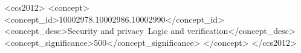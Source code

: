 \documentclass[sigconf,anonymous,review]{acmart}
\begin{document}
\begin{CCSXML}
<ccs2012>
  <concept>
      <concept_id>10002978.10002986.10002990</concept_id>
      <concept_desc>Security and privacy~Logic and verification</concept_desc>
      <concept_significance>500</concept_significance>
      </concept>
</ccs2012>
\end{CCSXML}
  




\maketitle
\end{document}
